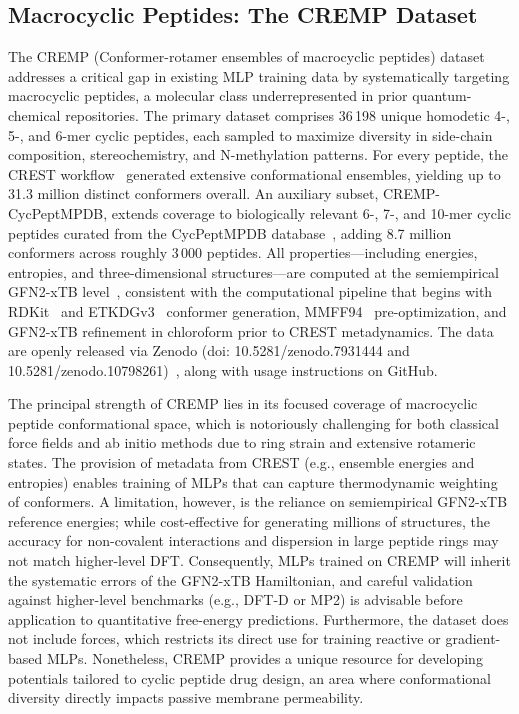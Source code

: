 \documentclass[12pt]{article}
\begin{document}
\subsection{Macrocyclic Peptides: The CREMP Dataset}
\label{sec:cremp}

The CREMP (Conformer-rotamer ensembles of macrocyclic peptides) dataset~\cite{ds33-15} addresses a critical gap in existing MLP training data by systematically targeting macrocyclic peptides, a molecular class underrepresented in prior quantum-chemical repositories. The primary dataset comprises 36\,198 unique homodetic 4-, 5-, and 6-mer cyclic peptides, each sampled to maximize diversity in side-chain composition, stereochemistry, and N-methylation patterns. For every peptide, the CREST workflow~\cite{ds33-164} generated extensive conformational ensembles, yielding up to 31.3 million distinct conformers overall. An auxiliary subset, CREMP-CycPeptMPDB, extends coverage to biologically relevant 6-, 7-, and 10-mer cyclic peptides curated from the CycPeptMPDB database~\cite{ds33-162}, adding 8.7 million conformers across roughly 3\,000 peptides. All properties—including energies, entropies, and three-dimensional structures—are computed at the semiempirical GFN2-xTB level~\cite{ds33-64}, consistent with the computational pipeline that begins with RDKit~\cite{ds33-97} and ETKDGv3~\cite{ds33-163} conformer generation, MMFF94~\cite{ds33-78} pre-optimization, and GFN2-xTB refinement in chloroform prior to CREST metadynamics. The data are openly released via Zenodo (doi: 10.5281/zenodo.7931444 and 10.5281/zenodo.10798261)~\cite{ds33-165}, along with usage instructions on GitHub.

The principal strength of CREMP lies in its focused coverage of macrocyclic peptide conformational space, which is notoriously challenging for both classical force fields and ab initio methods due to ring strain and extensive rotameric states. The provision of metadata from CREST (e.g., ensemble energies and entropies) enables training of MLPs that can capture thermodynamic weighting of conformers. A limitation, however, is the reliance on semiempirical GFN2-xTB reference energies; while cost-effective for generating millions of structures, the accuracy for non-covalent interactions and dispersion in large peptide rings may not match higher-level DFT. Consequently, MLPs trained on CREMP will inherit the systematic errors of the GFN2-xTB Hamiltonian, and careful validation against higher-level benchmarks (e.g., DFT-D or MP2) is advisable before application to quantitative free-energy predictions. Furthermore, the dataset does not include forces, which restricts its direct use for training reactive or gradient-based MLPs. Nonetheless, CREMP provides a unique resource for developing potentials tailored to cyclic peptide drug design, an area where conformational diversity directly impacts passive membrane permeability.
\end{document}
